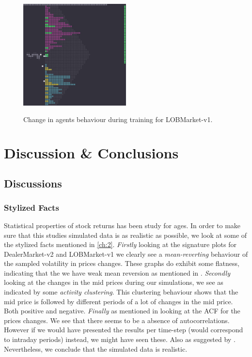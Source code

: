 \documentclass{kththesis}
\theoremstyle{definition}
\begin{document}
\begin{figure}[H]
{\includegraphics[width=0.5\textwidth]{LOBMarket_eps1_lstm.jpg}
\label{fig:svl4}}
\caption{Change in agents behaviour during training for LOBMarket-v1.}
\label{fig:vizl1}
\end{figure}




\chapter{Discussion \& Conclusions}\label{ch:7}

\section{Discussions}

\subsection{Stylized Facts}
Statistical properties of stock returns has been study for ages. In order to make sure that this studies simulated data is as realistic as possible, we look at some of the stylized facts mentioned in \autoref{ch:2}. \textit{Firstly} looking at the signature plots for DealerMarket-v2 and LOBMarket-v1 we clearly see a \textit{mean-reverting} behaviour of the sampled volatility in prices changes. These graphs do exhibit some flatness, indicating that the we have weak mean reversion as mentioned in \parencite{bouchaud2018trades}.
\newline
\newline
\textit{Secondly} looking at the changes in the mid prices during our simulations, we see as indicated by \textcite{bouchaud2018trades} some \textit{activity clustering}. This clustering behaviour shows that the mid price is followed by different periods of a lot of changes in the mid price. Both positive and negative. \textit{Finally} as mentioned in \parencite{cont2001empirical} looking at the ACF for the prices changes. We see that there seems to be a absence of autocorrelations. However if we would have presented the results per time-step (would correspond to intraday periods) instead, we might have seen these. Also as suggested by \textcite{cont2001empirical}. Nevertheless, we conclude that the simulated data is realistic.
\end{document}
